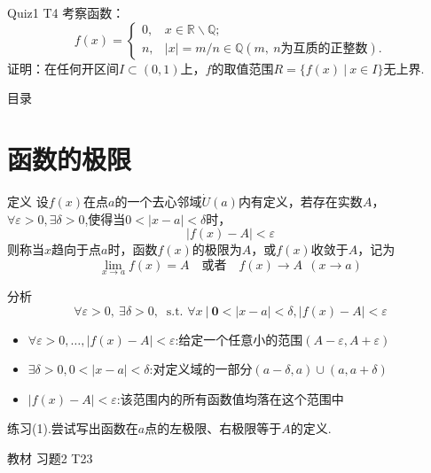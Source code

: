 \documentclass[]{beamer}
\begin{document}
\begin{frame}{Quiz1 T4}
    考察函数：
    \[
    f(x)=\left\{
    \begin{array}{ll}
        0, &x\in \mathbb R \backslash \mathbb Q;\\
        n, &|x|=m/n\in\mathbb Q(m,\ n\text{为互质的正整数}).
    \end{array}
    \right.
    \]
    证明：在任何开区间$I\subset (0,1)$上，$f$的取值范围$R=\{f(x)\ |\ x\in I\}$无上界.
\end{frame}

\begin{frame}{目录}
    \tableofcontents
\end{frame}



\section{函数的极限}

\begin{frame}{定义}
    设$f(x)$在点$a$的一个去心邻域$\dot U(a)$内有定义，若存在实数$A$，
    $\forall\varepsilon>0, \exists\delta>0$,使得当$0<|x-a|<\delta$时，
    \[
    |f(x)-A|<\varepsilon
    \]
    则称当$x$趋向于点$a$时，函数$f(x)$的极限为$A$，或$f(x)$收敛于$A$，记为
    \[
    \lim_{x\rightarrow a}f(x)=A \quad \text{或者} \quad f(x)\rightarrow A\ \ (x\rightarrow a)
    \]
\end{frame}

\begin{frame}{分析}
    \[
    \forall\varepsilon>0,\ \exists\delta>0,\ \text{ s.t. } \forall x\ |\ \mathbf{0}<|x-a|<\delta, |f(x)-A|<\varepsilon
    \]
    \begin{itemize}
        \item $\forall \varepsilon>0, \ldots,|f(x)-A|<\varepsilon$:给定一个任意小的范围$(A-\varepsilon,A+\varepsilon)$
        \item $\exists \delta>0, 0<|x-a|<\delta$:对定义域的一部分$(a-\delta,a)\cup(a,a+\delta)$
        \item $|f(x)-A|<\varepsilon$:该范围内的所有函数值均落在这个范围中
    \end{itemize}
    练习(1).尝试写出函数在$a$点的左极限、右极限等于$A$的定义.

    教材 习题2 T23
\end{frame}
\end{document}
